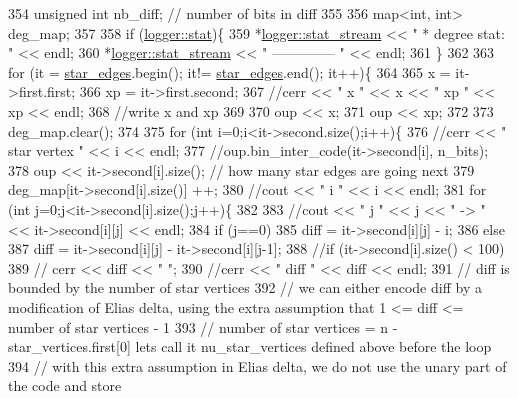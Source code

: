 \begin{DoxyCode}
354   \textcolor{keywordtype}{unsigned} \textcolor{keywordtype}{int} nb\_diff; \textcolor{comment}{// number of bits in diff}
355 
356   map<int, int> deg\_map;
357 
358   \textcolor{keywordflow}{if} (\hyperlink{classlogger_a26812b5ba03f130e8dae3446d5fc032f}{logger::stat})\{
359     *\hyperlink{classlogger_a7db37821f875f2ba3540980b355779f5}{logger::stat\_stream} << \textcolor{stringliteral}{" * degree stat: "} << endl;
360     *\hyperlink{classlogger_a7db37821f875f2ba3540980b355779f5}{logger::stat\_stream} << \textcolor{stringliteral}{" -------------- "} << endl;
361   \}
362 
363   \textcolor{keywordflow}{for} (it = \hyperlink{classmarked__graph__compressed_a7df5779d313486644132bd816937f532}{star\_edges}.begin(); it!= \hyperlink{classmarked__graph__compressed_a7df5779d313486644132bd816937f532}{star\_edges}.end(); it++)\{
364 
365     x = it->first.first;
366     xp = it->first.second;
367     \textcolor{comment}{//cerr << " x " << x << " xp " << xp << endl;}
368     \textcolor{comment}{//write x and xp}
369 
370     oup << x;
371     oup << xp;
372 
373     deg\_map.clear();
374 
375     \textcolor{keywordflow}{for} (\textcolor{keywordtype}{int} i=0;i<it->second.size();i++)\{
376       \textcolor{comment}{//cerr << " star vertex " << i << endl;}
377       \textcolor{comment}{//oup.bin\_inter\_code(it->second[i], n\_bits);}
378       oup << it->second[i].size(); \textcolor{comment}{// how many star edges are going next}
379       deg\_map[it->second[i].size()] ++;
380       \textcolor{comment}{//cout << " i " << i << endl;}
381       \textcolor{keywordflow}{for} (\textcolor{keywordtype}{int} j=0;j<it->second[i].size();j++)\{
382         
383         \textcolor{comment}{//cout << " j " << j << " -> " << it->second[i][j] << endl;}
384         \textcolor{keywordflow}{if} (j==0)
385           diff = it->second[i][j] - i;
386         \textcolor{keywordflow}{else}
387           diff = it->second[i][j] - it->second[i][j-1];
388         \textcolor{comment}{//if (it->second[i].size() < 100)}
389         \textcolor{comment}{//  cerr << diff << " ";}
390         \textcolor{comment}{//cerr << " diff " << diff << endl;}
391         \textcolor{comment}{// diff is bounded by the number of star vertices}
392         \textcolor{comment}{// we can either encode diff by a modification of Elias delta, using the extra assumption that 1 <=
       diff <= number of star vertices - 1}
393         \textcolor{comment}{// number of star vertices = n - star\_vertices.first[0] lets call it nu\_star\_vertices defined above
       before the loop}
394         \textcolor{comment}{// with this extra assumption in Elias delta, we do not use the unary part of the code and store
}
\end{DoxyCode}
